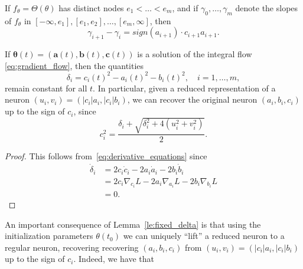 
\begin{lemma} If $f_\theta = \Theta(\theta)$ has distinct nodes $e_1 < \ldots
< e_m$, and if $\gamma_0,\ldots,\gamma_{m}$ denote the slopes of $f_\theta$ in
$[-\infty, e_1],[e_1,e_2],\ldots,[e_m,\infty]$, then
\begin{equation}
\gamma_{i+1} - \gamma_i = sign(a_{i+1}) \cdot c_{i+1} a_{i+1}.
\end{equation}
\end{lemma}


\begin{lemma} \label{le:fixed_delta}
If $\bm \theta(t) = (\bm a(t), \bm b(t), \bm c(t))$ is a solution of the integral flow \eqref{eq:gradient_flow}, then the quantities
\begin{equation}
\delta_i = c_i(t)^2 - a_i(t)^2 - b_i(t)^2, \quad i = 1, \ldots, m,
\end{equation}
remain constant for all $t$. In particular, given a reduced representation of a neuron $(u_i,v_i) = (|c_i|a_i,|c_i|b_i)$, we can recover the original neuron $(a_i,b_i,c_i)$ up to the sign of $c_i$, since
\begin{equation}\label{eq:c_uv}
    c_i^2 = \frac{\delta_i + \sqrt{\delta_i^2 + 4 (u_i^2 + v_i^2)}}{2}. 
\end{equation}
\end{lemma}
\begin{proof} This follows from~\eqref{eq:derivative_equations} since
\begin{equation}\label{eq:delta_i}
\begin{aligned}
\dot{\delta}_i &= 2 c_i \dot{c}_i - 2 a_i \dot{a}_i - 2 b_i \dot{b}_i \\
               &= 2 c_i \nabla_{c_i} L - 2 a_{i} \nabla_{a_{i}} L - 2 b_i \nabla_{b_i} L \\
               &= 0.
\end{aligned}
\end{equation}
\end{proof}
An important consequence of Lemma~\ref{le:fixed_delta} is that using the initialization parameters $\theta(t_0)$ we can uniquely ``lift'' a reduced neuron to a regular neuron, recovering recovering $(a_i,b_i, c_i)$ from $(u_i,v_i) = (|c_i| a_i, |c_i| b_i)$ up to the sign of $c_i$. Indeed, we have that

